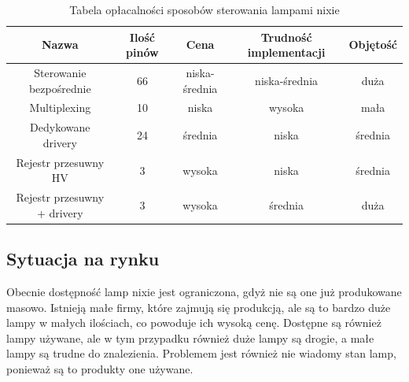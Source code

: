 \documentclass[../main.tex]{subfiles}
\begin{document}
\begin{table}[H]
  \centering
  \begin{tabular}{|c|c|c|c|c|}
    \hline
    Nazwa & Ilość pinów & Cena & Trudność implementacji & Objętość\\
    \hline
    Sterowanie bezpośrednie & 66 & niska-średnia & niska-średnia & duża \\
    \hline
    Multiplexing & 10 &niska & wysoka & mała \\
    \hline
    Dedykowane drivery & 24 &średnia & niska & średnia \\
    \hline
    Rejestr przesuwny HV & 3 &wysoka & niska & średnia \\
    \hline
    Rejestr przesuwny + drivery & 3 & wysoka & średnia & duża \\
    \hline
  \end{tabular}
  \caption{Tabela opłacalności sposobów sterowania lampami nixie}
\end{table}

\subsection{Sytuacja na rynku}
Obecnie dostępność lamp nixie jest ograniczona, gdyż nie są one już produkowane masowo. Istnieją małe firmy, które zajmują się produkcją, ale są to bardzo
duże lampy w małych ilościach, co powoduje ich wysoką cenę. Dostępne są również lampy używane, ale w tym przypadku również duże lampy są drogie, a małe lampy są trudne do znalezienia.
Problemem jest również nie wiadomy stan lamp, ponieważ są to produkty one używane.
\end{document}
